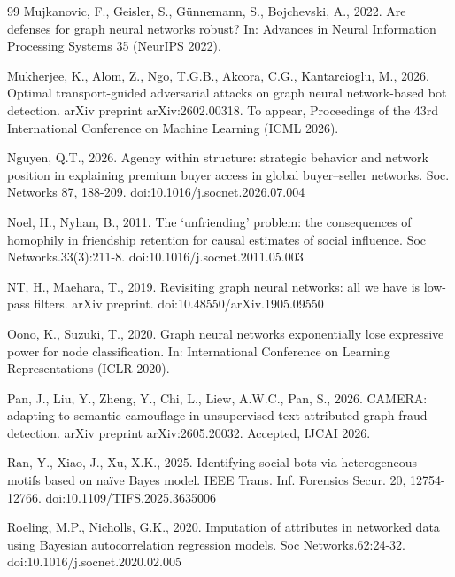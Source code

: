 \documentclass[preprint,12pt,authoryear]{elsarticle}
\theoremstyle{definition}
\begin{document}
\begin{thebibliography}{99}
Mujkanovic, F., Geisler, S., G\"unnemann, S., Bojchevski, A., 2022. Are defenses for graph neural networks robust? In: Advances in Neural Information Processing Systems 35 (NeurIPS 2022).

Mukherjee, K., Alom, Z., Ngo, T.G.B., Akcora, C.G., Kantarcioglu, M., 2026. Optimal transport-guided adversarial attacks on graph neural network-based bot detection. arXiv preprint arXiv:2602.00318. To appear, Proceedings of the 43rd International Conference on Machine Learning (ICML 2026).

Nguyen, Q.T., 2026. Agency within structure: strategic behavior and network position in explaining premium buyer access in global buyer--seller networks. Soc. Networks 87, 188-209. doi:10.1016/j.socnet.2026.07.004

Noel, H., Nyhan, B., 2011. The `unfriending' problem: the consequences of homophily in friendship retention for causal estimates of social influence. Soc Networks.33(3):211-8. doi:10.1016/j.socnet.2011.05.003

NT, H., Maehara, T., 2019. Revisiting graph neural networks: all we have is low-pass filters. arXiv preprint. doi:10.48550/arXiv.1905.09550

Oono, K., Suzuki, T., 2020. Graph neural networks exponentially lose expressive power for node classification. In: International Conference on Learning Representations (ICLR 2020).

Pan, J., Liu, Y., Zheng, Y., Chi, L., Liew, A.W.C., Pan, S., 2026. CAMERA: adapting to semantic camouflage in unsupervised text-attributed graph fraud detection. arXiv preprint arXiv:2605.20032. Accepted, IJCAI 2026.

Ran, Y., Xiao, J., Xu, X.K., 2025. Identifying social bots via heterogeneous motifs based on na\"ive Bayes model. IEEE Trans. Inf. Forensics Secur. 20, 12754-12766. doi:10.1109/TIFS.2025.3635006

Roeling, M.P., Nicholls, G.K., 2020. Imputation of attributes in networked data using Bayesian autocorrelation regression models. Soc Networks.62:24-32. doi:10.1016/j.socnet.2020.02.005


\end{thebibliography}
\end{document}
